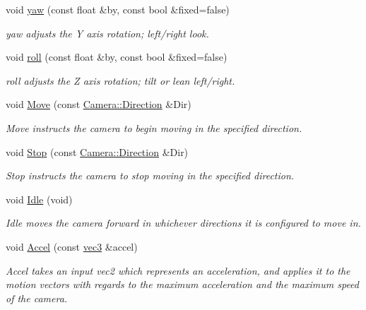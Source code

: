 \begin{DoxyCompactItemize}
void \hyperlink{class_camera_a0ce7d12edbe47d9a8915d8af98d8f524}{yaw} (const float \&by, const bool \&fixed=false)
\begin{DoxyCompactList}\small\item\em yaw adjusts the Y axis rotation; left/right look. \end{DoxyCompactList}\item 
void \hyperlink{class_camera_a1ba0979fe0b2ec58085d5f9721858e5e}{roll} (const float \&by, const bool \&fixed=false)
\begin{DoxyCompactList}\small\item\em roll adjusts the Z axis rotation; tilt or lean left/right. \end{DoxyCompactList}\item 
void \hyperlink{class_camera_a421e03f93824e178d6e77ff547cd290e}{Move} (const \hyperlink{class_camera_a80cb65605322d27ad3b6d973484509ec}{Camera\-::\-Direction} \&Dir)
\begin{DoxyCompactList}\small\item\em Move instructs the camera to begin moving in the specified direction. \end{DoxyCompactList}\item 
void \hyperlink{class_camera_adf064f765f610684e0675bd67de013fd}{Stop} (const \hyperlink{class_camera_a80cb65605322d27ad3b6d973484509ec}{Camera\-::\-Direction} \&Dir)
\begin{DoxyCompactList}\small\item\em Stop instructs the camera to stop moving in the specified direction. \end{DoxyCompactList}\item 
void \hyperlink{class_camera_aec3559fe43597656629fdb00157d3c73}{Idle} (void)
\begin{DoxyCompactList}\small\item\em Idle moves the camera forward in whichever directions it is configured to move in. \end{DoxyCompactList}\item 
void \hyperlink{class_camera_a8eb4ebda2379e7289bb2bb942a2796b4}{Accel} (const \hyperlink{struct_angel_1_1vec3}{vec3} \&accel)
\begin{DoxyCompactList}\small\item\em Accel takes an input vec2 which represents an acceleration, and applies it to the motion vectors with regards to the maximum acceleration and the maximum speed of the camera. \end{DoxyCompactList}\item 

\end{DoxyCompactItemize}

